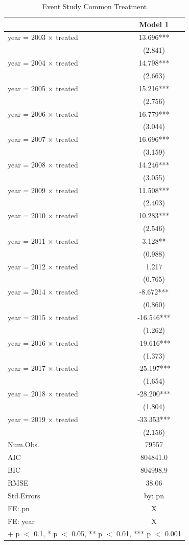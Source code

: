 \documentclass[
  12pt,
]{article}
\begin{document}
\begin{table}

\caption{\label{tab:table-4}Event Study Common Treatment}
\centering
\begin{tabular}[t]{lc}
\toprule
  & Model 1\\
\midrule
year = 2003 × treated & 13.696***\\
 & (2.841)\\
year = 2004 × treated & 14.798***\\
 & (2.663)\\
year = 2005 × treated & 15.216***\\
 & (2.756)\\
year = 2006 × treated & 16.779***\\
 & (3.044)\\
year = 2007 × treated & 16.696***\\
 & (3.159)\\
year = 2008 × treated & 14.246***\\
 & (3.055)\\
year = 2009 × treated & 11.508***\\
 & (2.403)\\
year = 2010 × treated & 10.283***\\
 & (2.546)\\
year = 2011 × treated & 3.128**\\
 & (0.988)\\
year = 2012 × treated & 1.217\\
 & (0.765)\\
year = 2014 × treated & -8.672***\\
 & (0.860)\\
year = 2015 × treated & -16.546***\\
 & (1.262)\\
year = 2016 × treated & -19.616***\\
 & (1.373)\\
year = 2017 × treated & -25.197***\\
 & (1.654)\\
year = 2018 × treated & -28.200***\\
 & (1.804)\\
year = 2019 × treated & -33.353***\\
 & (2.156)\\
\midrule
Num.Obs. & 79557\\
AIC & 804841.0\\
BIC & 804998.9\\
RMSE & 38.06\\
Std.Errors & by: pn\\
FE: pn & X\\
FE: year & X\\
\bottomrule
\multicolumn{2}{l}{\rule{0pt}{1em}+ p $<$ 0.1, * p $<$ 0.05, ** p $<$ 0.01, *** p $<$ 0.001}\\
\end{tabular}
\end{table}
\end{document}
